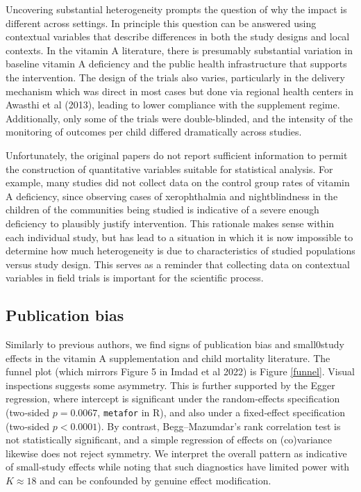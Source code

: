 \documentclass[12pt]{article}
\begin{document}
Uncovering substantial heterogeneity prompts the question of why the impact is different across settings. In principle this question can be answered using contextual variables that describe differences in both the study designs and local contexts. In the vitamin A literature, there is presumably substantial variation in baseline vitamin A deficiency and the public health infrastructure that supports the intervention. The design of the trials also varies, particularly in the delivery mechanism which was direct in most cases but done via regional health centers in Awasthi et al (2013), leading to lower compliance with the supplement regime. Additionally, only some of the trials were double-blinded, and the intensity of the monitoring of outcomes per child differed dramatically across studies. 

Unfortunately, the original papers do not report sufficient information to permit the construction of quantitative variables suitable for statistical analysis. For example, many studies did not collect data on the control group rates of vitamin A deficiency, since observing cases of xerophthalmia and nightblindness in the children of the communities being studied is indicative of a severe enough deficiency to plausibly justify intervention. This rationale makes sense within each individual study, but has lead to a situation in which it is now impossible to determine how much heterogeneity is due to characteristics of studied populations versus study design. This serves as a reminder that collecting data on contextual variables in field trials is important for the scientific process. 


\subsection{Publication bias}

Similarly to previous authors, we find signs of publication bias and small0study effects in the vitamin A supplementation and child mortality literature. The funnel plot (which mirrors Figure 5 in Imdad et al 2022) is Figure \ref{funnel}. Visual inspections suggests some asymmetry.
This is further supported by the Egger regression, where intercept is significant under the random‐effects specification (two‐sided \(p=0.0067\), \texttt{metafor} in \textsf{R}), and also under a fixed‐effect specification (two‐sided \(p<0.0001\)). By contrast, Begg–Mazumdar’s rank correlation test is not statistically significant, and a simple regression of effects on (co)variance likewise does not reject symmetry. We interpret the overall pattern as indicative of small‐study effects while noting that such diagnostics have limited power with \(K\approx 18\) and can be confounded by genuine effect modification.
\end{document}
